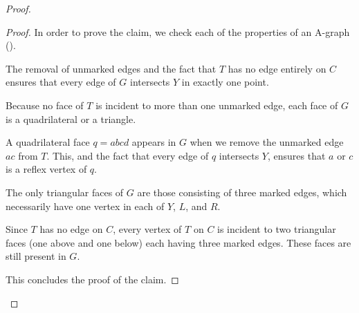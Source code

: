 \begin{proof}
	\begin{proof}
In order to	prove the claim, we check each of the properties of an A-graph
	().
	\begin{compactenum}
		\item The removal of unmarked edges and the fact that $T$ has no
		edge entirely on $C$ ensures that every edge of $G$ intersects $Y$
		in exactly one point.
		\item Because no face of $T$ is incident to more than one unmarked edge,
		each face of $G$ is a quadrilateral or a triangle.  
		\item A quadrilateral face $q=abcd$ appears in $G$ when we remove the unmarked edge $ac$ from $T$. This, and the fact that every edge of $q$ intersects $Y$, ensures that $a$ or $c$ is a reflex vertex of $q$.
		\item The only triangular faces of $G$ are those consisting
		of three marked edges, which necessarily have one vertex in
		each of $Y$, $L$, and $R$.
		\item Since $T$ has no edge on $C$, every vertex of $T$ on $C$
		is incident to two triangular faces (one above and one below)
		each having three marked edges. These faces are still present in $G$.
	\end{compactenum}
This concludes the proof of the claim.
\end{proof}	



\end{proof}
